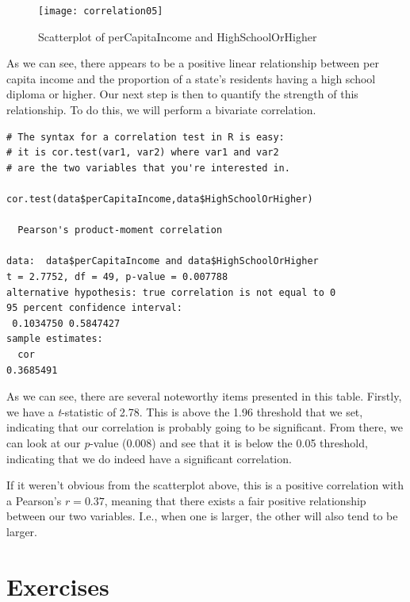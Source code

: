 \begin{figure}[h]
\texttt{[image: correlation05]}
\label{fig:correlation05}
\caption{Scatterplot of perCapitaIncome and HighSchoolOrHigher}
\end{figure}
As we can see, there appears to be a positive linear relationship between per capita income and the proportion of a state's residents having a high school diploma or higher. Our next step is then to quantify the strength of this relationship. To do this, we will perform a bivariate correlation.

\begin{framed}
\begin{Verbatim}[samepage=TRUE]
# The syntax for a correlation test in R is easy:
# it is cor.test(var1, var2) where var1 and var2
# are the two variables that you're interested in.

cor.test(data$perCapitaIncome,data$HighSchoolOrHigher)

  Pearson's product-moment correlation

data:  data$perCapitaIncome and data$HighSchoolOrHigher
t = 2.7752, df = 49, p-value = 0.007788
alternative hypothesis: true correlation is not equal to 0
95 percent confidence interval:
 0.1034750 0.5847427
sample estimates:
  cor 
0.3685491 
\end{Verbatim}
\end{framed}

As we can see, there are several noteworthy items presented in this table. Firstly, we have a \textit{t}-statistic of 2.78. This is above the 1.96 threshold that we set, indicating that our correlation is probably going to be significant. From there, we can look at our \textit{p}-value (0.008) and see that it is below the 0.05 threshold, indicating that we do indeed have a significant correlation.

If it weren't obvious from the scatterplot above, this is a positive correlation with a Pearson's $r=0.37$, meaning that there exists a fair positive relationship between our two variables. I.e., when one is larger, the other will also tend to be larger.

\section{Exercises}

